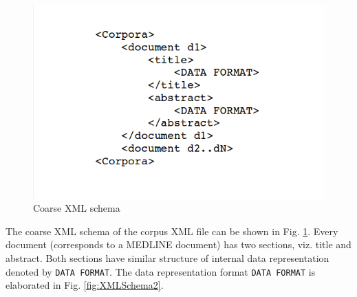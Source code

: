 \begin{enumerate}
\begin{figure}
\centering
\includegraphics[scale=0.4]{figures/XMLSchema1.png}
\caption{Coarse XML schema}\label{fig:XMLSchema1}
\end{figure}

The coarse XML schema of the corpus XML file can be shown in Fig. \ref{fig:XMLSchema1}. Every document (corresponds to a MEDLINE document) has two sections, viz. title and abstract. Both sections have similar structure of internal data representation denoted by \texttt{DATA FORMAT}. The data representation format \texttt{DATA FORMAT} is elaborated in Fig. \ref{fig:XMLSchema2}.


\end{enumerate}
